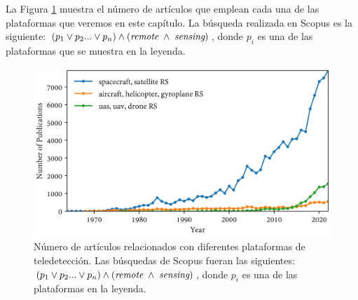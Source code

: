 La Figura \ref{fig:scopus_search_platforms_spanish} muestra el número de artículos que emplean cada una de las plataformas que veremos en este capítulo. La búsqueda realizada en Scopus es la siguiente: $(p_1 \lor p_2 ... \lor p_n) \land (\textit{remote} \hspace{1mm} \land \hspace{1mm} \textit{sensing})$, donde $p_i$ es una de las plataformas que se muestra en la leyenda.

\begin{figure}[!ht]
	\includegraphics[width=\linewidth]{figs/introduction/platform_timeline.png}
	\caption{Número de artículos relacionados con diferentes plataformas de teledetección. Las búsquedas de Scopus fueran las siguientes: $(p_1 \lor p_2 ... \lor p_n) \land (\textit{remote} \hspace{1mm} \land \hspace{1mm} \textit{sensing})$, donde $p_i$ es una de las plataformas en la leyenda. }
    \label{fig:scopus_search_platforms_spanish}
\end{figure}

